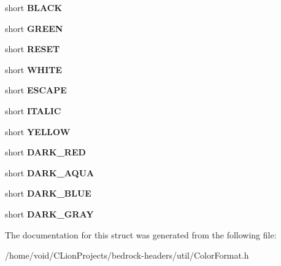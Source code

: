 \begin{DoxyCompactItemize}
short {\bfseries B\+L\+A\+CK}
\item 
\mbox{\label{struct_color_format_a388e4a43356c59c928c0d2faa8bba8f2}} 
short {\bfseries G\+R\+E\+EN}
\item 
\mbox{\label{struct_color_format_aca4ab53f53ac58a823d771aaefceb668}} 
short {\bfseries R\+E\+S\+ET}
\item 
\mbox{\label{struct_color_format_adc02c3487ff11f7d19f40022514a3fb7}} 
short {\bfseries W\+H\+I\+TE}
\item 
\mbox{\label{struct_color_format_a1e216be059fccba7e23f3c3cb047f057}} 
short {\bfseries E\+S\+C\+A\+PE}
\item 
\mbox{\label{struct_color_format_ac7a9436d87af13ddd0553b87172dd24f}} 
short {\bfseries I\+T\+A\+L\+IC}
\item 
\mbox{\label{struct_color_format_a7616620b5531da29d1c4e7be98c4c4ce}} 
short {\bfseries Y\+E\+L\+L\+OW}
\item 
\mbox{\label{struct_color_format_ae6f959220fb50a475d2ca9c536b33448}} 
short {\bfseries D\+A\+R\+K\+\_\+\+R\+ED}
\item 
\mbox{\label{struct_color_format_a4ad8fb56c832b57693aa2c85f49a7f02}} 
short {\bfseries D\+A\+R\+K\+\_\+\+A\+Q\+UA}
\item 
\mbox{\label{struct_color_format_a358ea912b90b69a4d7b2a8c076ba06d4}} 
short {\bfseries D\+A\+R\+K\+\_\+\+B\+L\+UE}
\item 
\mbox{\label{struct_color_format_ad3854015a282c2ffa105021e38f14ced}} 
short {\bfseries D\+A\+R\+K\+\_\+\+G\+R\+AY}
\end{DoxyCompactItemize}


The documentation for this struct was generated from the following file\+:\begin{DoxyCompactItemize}
\item 
/home/void/\+C\+Lion\+Projects/bedrock-\/headers/util/Color\+Format.\+h\end{DoxyCompactItemize}
